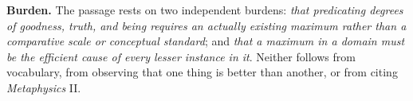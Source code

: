 \textbf{Burden.} The passage rests on two independent burdens: \emph{that predicating degrees of goodness, truth, and being requires an actually existing maximum rather than a comparative scale or conceptual standard}; and \emph{that a maximum in a domain must be the efficient cause of every lesser instance in it}. Neither follows from vocabulary, from observing that one thing is better than another, or from citing \emph{Metaphysics} II.
